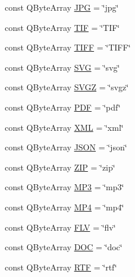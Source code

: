 \begin{DoxyCompactItemize}
\item 
const Q\+Byte\+Array \hyperlink{namespace_f_i_l_e___e_x_t_e_n_t_i_o_n_aa329b14cf5e415a014703e301964f3b7}{J\+PG} = \char`\"{}jpg\char`\"{}
\item 
const Q\+Byte\+Array \hyperlink{namespace_f_i_l_e___e_x_t_e_n_t_i_o_n_a427701674d2fcdb0b6c2ffe59e96b8c3}{T\+IF} = \char`\"{}T\+IF\char`\"{}
\item 
const Q\+Byte\+Array \hyperlink{namespace_f_i_l_e___e_x_t_e_n_t_i_o_n_ac94c9511128b5d2f4ed0844a6b1466d2}{T\+I\+FF} = \char`\"{}T\+I\+FF\char`\"{}
\item 
const Q\+Byte\+Array \hyperlink{namespace_f_i_l_e___e_x_t_e_n_t_i_o_n_af96f60c80969b82f16d709df291fccd6}{S\+VG} = \char`\"{}svg\char`\"{}
\item 
const Q\+Byte\+Array \hyperlink{namespace_f_i_l_e___e_x_t_e_n_t_i_o_n_aa1483cdcb089b0453fa51ba49ed27400}{S\+V\+GZ} = \char`\"{}svgz\char`\"{}
\item 
const Q\+Byte\+Array \hyperlink{namespace_f_i_l_e___e_x_t_e_n_t_i_o_n_a45812baa22f7a6e9020237daf0021282}{P\+DF} = \char`\"{}pdf\char`\"{}
\item 
const Q\+Byte\+Array \hyperlink{namespace_f_i_l_e___e_x_t_e_n_t_i_o_n_a6a54d9b617ae20911eed482fee8f0eb2}{X\+ML} = \char`\"{}xml\char`\"{}
\item 
const Q\+Byte\+Array \hyperlink{namespace_f_i_l_e___e_x_t_e_n_t_i_o_n_ae7a09904d0f399eabe61cfc67d684961}{J\+S\+ON} = \char`\"{}json\char`\"{}
\item 
const Q\+Byte\+Array \hyperlink{namespace_f_i_l_e___e_x_t_e_n_t_i_o_n_a59d6f61f84697257891771696ad0e6c2}{Z\+IP} = \char`\"{}zip\char`\"{}
\item 
const Q\+Byte\+Array \hyperlink{namespace_f_i_l_e___e_x_t_e_n_t_i_o_n_a5915d55ee5e44cbfeccd57756a4b5ff7}{M\+P3} = \char`\"{}mp3\char`\"{}
\item 
const Q\+Byte\+Array \hyperlink{namespace_f_i_l_e___e_x_t_e_n_t_i_o_n_a1cc605c1595aa024dedf6ffb2630668e}{M\+P4} = \char`\"{}mp4\char`\"{}
\item 
const Q\+Byte\+Array \hyperlink{namespace_f_i_l_e___e_x_t_e_n_t_i_o_n_a51a3597f2bb54c9120f3b368f5129aa6}{F\+LV} = \char`\"{}flv\char`\"{}
\item 
const Q\+Byte\+Array \hyperlink{namespace_f_i_l_e___e_x_t_e_n_t_i_o_n_acae0f83c9bb842f915fdc84e598a046a}{D\+OC} = \char`\"{}doc\char`\"{}
\item 
const Q\+Byte\+Array \hyperlink{namespace_f_i_l_e___e_x_t_e_n_t_i_o_n_ad6c003b2c271e5cfba096ec2ad01b093}{R\+TF} = \char`\"{}rtf\char`\"{}

\end{DoxyCompactItemize}

